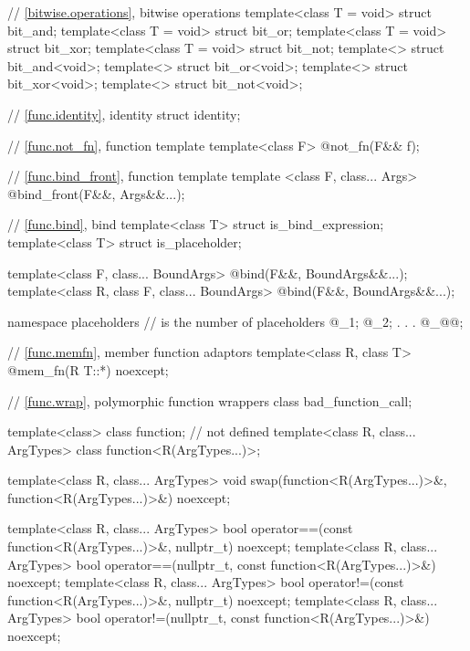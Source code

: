 \begin{codeblock}
{  // \ref{bitwise.operations}, bitwise operations
  template<class T = void> struct bit_and;
  template<class T = void> struct bit_or;
  template<class T = void> struct bit_xor;
  template<class T = void> struct bit_not;
  template<> struct bit_and<void>;
  template<> struct bit_or<void>;
  template<> struct bit_xor<void>;
  template<> struct bit_not<void>;

  // \ref{func.identity}, identity
  struct identity;

  // \ref{func.not_fn}, function template 
  template<class F> @\unspec@ not_fn(F&& f);

  // \ref{func.bind_front}, function template 
  template <class F, class... Args> @\unspec@ bind_front(F&&, Args&&...);

  // \ref{func.bind}, bind
  template<class T> struct is_bind_expression;
  template<class T> struct is_placeholder;

  template<class F, class... BoundArgs>
    @\unspec@ bind(F&&, BoundArgs&&...);
  template<class R, class F, class... BoundArgs>
    @\unspec@ bind(F&&, BoundArgs&&...);

  namespace placeholders {
    //  is the  number of placeholders
    @\seebelownc@ _1;
    @\seebelownc@ _2;
               .
               .
               .
    @\seebelownc@ _@@;
  }

  // \ref{func.memfn}, member function adaptors
  template<class R, class T>
    @\unspec@ mem_fn(R T::*) noexcept;

  // \ref{func.wrap}, polymorphic function wrappers
  class bad_function_call;

  template<class> class function; // not defined
  template<class R, class... ArgTypes> class function<R(ArgTypes...)>;

  template<class R, class... ArgTypes>
    void swap(function<R(ArgTypes...)>&, function<R(ArgTypes...)>&) noexcept;

  template<class R, class... ArgTypes>
    bool operator==(const function<R(ArgTypes...)>&, nullptr_t) noexcept;
  template<class R, class... ArgTypes>
    bool operator==(nullptr_t, const function<R(ArgTypes...)>&) noexcept;
  template<class R, class... ArgTypes>
    bool operator!=(const function<R(ArgTypes...)>&, nullptr_t) noexcept;
  template<class R, class... ArgTypes>
    bool operator!=(nullptr_t, const function<R(ArgTypes...)>&) noexcept;

}
\end{codeblock}

